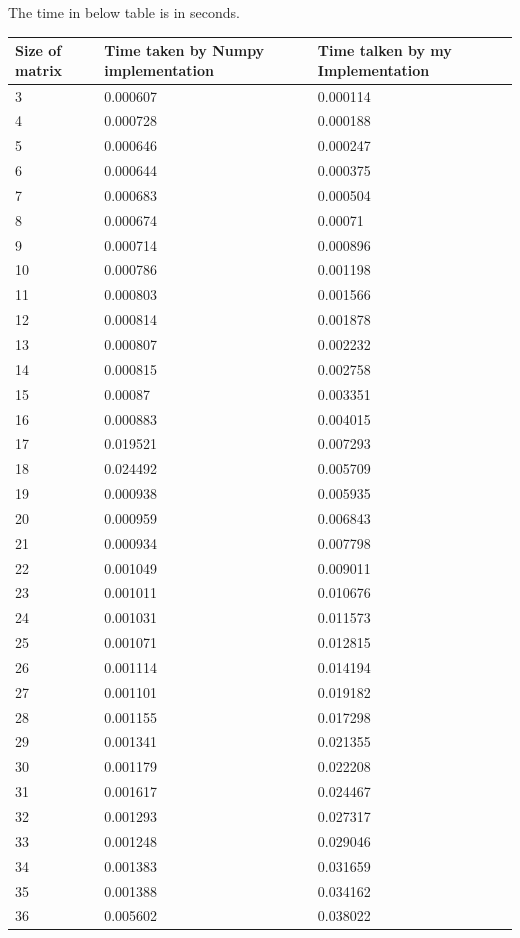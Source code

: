\documentclass[runningheads]{llncs}
\begin{document}
The time in below table is in seconds. 
\begin{longtable}{| p{} | p{} | p{} |} 
\hline
Size of matrix & Time taken by Numpy implementation & Time talken by my Implementation\\
\hline
3 & 0.000607 & 0.000114 \\
4 & 0.000728 & 0.000188 \\
5 & 0.000646 & 0.000247 \\
6 & 0.000644 & 0.000375 \\
7 & 0.000683 & 0.000504 \\
8 & 0.000674 & 0.00071 \\
9 & 0.000714 & 0.000896 \\
10 & 0.000786 & 0.001198 \\
11 & 0.000803 & 0.001566 \\
12 & 0.000814 & 0.001878 \\
13 & 0.000807 & 0.002232 \\
14 & 0.000815 & 0.002758 \\
15 & 0.00087 & 0.003351 \\
16 & 0.000883 & 0.004015 \\
17 & 0.019521 & 0.007293 \\
18 & 0.024492 & 0.005709 \\
19 & 0.000938 & 0.005935 \\
20 & 0.000959 & 0.006843 \\
21 & 0.000934 & 0.007798 \\
22 & 0.001049 & 0.009011 \\
23 & 0.001011 & 0.010676 \\
24 & 0.001031 & 0.011573 \\
25 & 0.001071 & 0.012815 \\
26 & 0.001114 & 0.014194 \\
27 & 0.001101 & 0.019182 \\
28 & 0.001155 & 0.017298 \\
29 & 0.001341 & 0.021355 \\
30 & 0.001179 & 0.022208 \\
31 & 0.001617 & 0.024467 \\
32 & 0.001293 & 0.027317 \\
33 & 0.001248 & 0.029046 \\
34 & 0.001383 & 0.031659 \\
35 & 0.001388 & 0.034162 \\
36 & 0.005602 & 0.038022 \\

\end{longtable}
\end{document}
